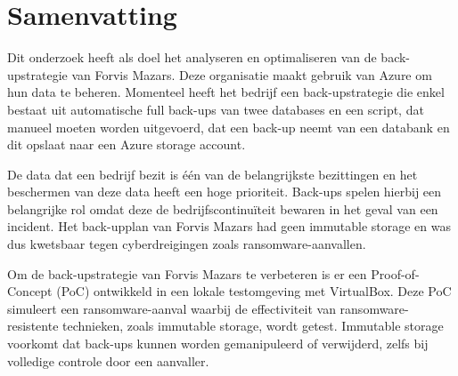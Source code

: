 
%
%
%
%
%

%



\chapter*{Samenvatting}
Dit onderzoek heeft als doel het analyseren en optimaliseren van de back-upstrategie van Forvis Mazars. Deze organisatie maakt gebruik van Azure om hun data te beheren. Momenteel heeft het bedrijf een back-upstrategie die enkel bestaat uit automatische full back-ups van twee databases en een script, dat manueel moeten worden uitgevoerd, dat een back-up neemt van een databank en dit opslaat naar een Azure storage account. 

De data dat een bedrijf bezit is één van de belangrijkste bezittingen en het beschermen van deze data heeft een hoge prioriteit. Back-ups spelen hierbij een belangrijke rol omdat deze de bedrijfscontinuïteit bewaren in het geval van een incident. Het back-upplan van Forvis Mazars had geen immutable storage en was dus kwetsbaar tegen cyberdreigingen zoals ransomware-aanvallen. 

Om de back-upstrategie van Forvis Mazars te verbeteren is er een Proof-of-Concept (PoC) ontwikkeld in een lokale testomgeving met VirtualBox. Deze PoC simuleert een ransomware-aanval waarbij de effectiviteit van ransomware-resistente technieken, zoals immutable storage, wordt getest. Immutable storage voorkomt dat back-ups kunnen worden gemanipuleerd of verwijderd, zelfs bij volledige controle door een aanvaller. 

